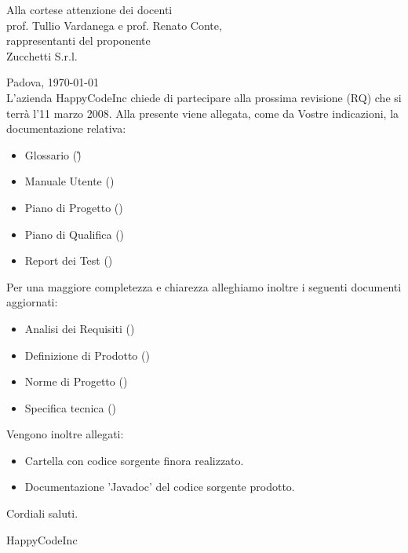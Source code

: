 


\newcommand{\dt}{ Lettera di accompagnamento }%




\thispagestyle{plain}
\begin{flushright}
Alla cortese attenzione dei docenti\\
prof. Tullio Vardanega e prof. Renato Conte,\\
rappresentanti del proponente\\
Zucchetti S.r.l.
\end{flushright}
Padova, \today \\

L'azienda HappyCodeInc chiede di partecipare alla prossima revisione (RQ) che si terr\`a l'11 marzo 2008.
Alla presente viene allegata, come da Vostre indicazioni, la documentazione relativa:
\begin{itemize}
\item{}Glossario (\G)
\item{}Manuale Utente (\MU)
\item{}Piano di Progetto (\PdP)
\item{}Piano di Qualifica (\PdQ)
\item{}Report dei Test (\TR)
\end{itemize}
Per una maggiore completezza e chiarezza alleghiamo inoltre i seguenti documenti aggiornati:
\begin{itemize}
\item{}Analisi dei Requisiti (\AR)
\item{}Definizione di Prodotto (\DdP)
\item{}Norme di Progetto (\NdP)
\item{}Specifica tecnica (\ST) 
\end{itemize}
Vengono inoltre allegati:
\begin{itemize}
\item{}Cartella con codice sorgente finora realizzato.
\item{}Documentazione 'Javadoc' del codice sorgente prodotto.
\end{itemize}

Cordiali saluti.
\begin{flushright}
HappyCodeInc
\end{flushright}
\newpage


